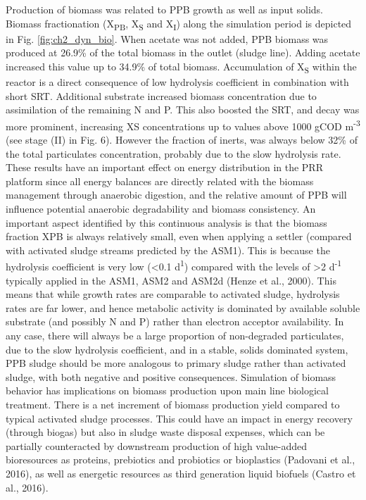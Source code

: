 \skippingparagraph
Production of biomass was related to PPB growth as well as input solids. Biomass fractionation (X\textsubscript{PB}, X\textsubscript{S} and X\textsubscript{I}) along the simulation period is depicted in Fig. \ref{fig:ch2_dyn_bio}. When acetate was not added, PPB biomass was produced at 26.9\% of the total biomass in the outlet (sludge line). Adding acetate increased this value up to 34.9\% of total biomass. Accumulation of X\textsubscript{S} within the reactor is a direct consequence of low hydrolysis coefficient in combination with short SRT. Additional substrate increased biomass concentration due to assimilation of the remaining N and P. This also boosted the SRT, and decay was more prominent, increasing XS concentrations up to values above 1000 gCOD m\textsuperscript{-3} (see stage (II) in Fig. 6). However the fraction of inerts, was always below 32\% of the total particulates concentration, probably due to the slow hydrolysis rate. These results have an important effect on energy distribution in the PRR platform since all energy balances are directly related with the biomass management through anaerobic digestion, and the relative amount of PPB will influence potential anaerobic degradability and biomass consistency. An important aspect identified by this continuous analysis is that the biomass fraction XPB is always relatively small, even when applying a settler (compared with activated sludge streams predicted by the ASM1). This is because the hydrolysis coefficient is very low (<0.1 d\textsuperscript{1}) compared with the levels of >2 d\textsuperscript{-1} typically applied in the ASM1, ASM2 and ASM2d \cite{henze1987} (Henze et al., 2000). This means that while growth rates are comparable to activated sludge, hydrolysis rates are far lower, and hence metabolic activity is dominated by available soluble substrate (and possibly N and P) rather than electron acceptor availability. In any case, there will always be a large proportion of non-degraded particulates, due to the slow hydrolysis coefficient, and in a stable, solids dominated system, PPB sludge should be more analogous to primary sludge rather than activated sludge, with both negative and positive consequences.
\skippingparagraph
Simulation of biomass behavior has implications on biomass production upon main line biological treatment. There is a net increment of biomass production yield compared to typical activated sludge processes. This could have an impact in energy recovery (through biogas) but also in sludge waste disposal expenses, which can be partially counteracted by downstream production of high value-added bioresources as proteins, prebiotics and probiotics \cite{matassa2015} or bioplastics (Padovani et al., 2016), as well as energetic resources as third generation liquid biofuels \cite{castro2017}(Castro et al., 2016).


